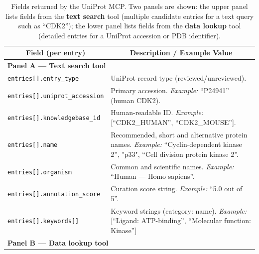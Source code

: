 \documentclass{article}
\begin{document}
\begin{table}[!htbp]
\caption{Fields returned by the UniProt MCP. Two panels are shown: the upper panel lists fields from the \textbf{text search} tool (multiple candidate entries for a text query such as “CDK2”); the lower panel lists fields from the \textbf{data lookup} tool (detailed entries for a UniProt accession or PDB identifier).}
\label{tab:uniprot-mcp-cdk2}
\begin{center}
\begin{tabularx}{\textwidth}{p{5.5cm}X}
\toprule
\multicolumn{1}{c}{\bf Field (per entry)} & \multicolumn{1}{c}{\bf Description / Example Value} \\
\midrule
\multicolumn{2}{l}{\bf Panel A — Text search tool} \\
\midrule
\texttt{entries[].entry\_type} & UniProt record type (reviewed/unreviewed). \\
\addlinespace
\texttt{entries[].uniprot\_accession} & Primary accession. \emph{Example:} “P24941” (human CDK2). \\
\addlinespace
\texttt{entries[].knowledgebase\_id} & Human-readable ID. \emph{Example:} [“CDK2\_HUMAN”, “CDK2\_MOUSE”]. \\
\addlinespace
\texttt{entries[].name} & Recommended, short and alternative protein names. \emph{Example:} “Cyclin-dependent kinase 2”, "p33", “Cell division protein kinase 2”. \\
\addlinespace
\texttt{entries[].organism} & Common and scientific names. \emph{Example:} “Human — Homo sapiens”. \\
\addlinespace
\texttt{entries[].annotation\_score} & Curation score string. \emph{Example:} “5.0 out of 5”. \\
\addlinespace
\texttt{entries[].keywords[]} & Keyword strings (category: name). \emph{Example:} [“Ligand: ATP-binding”, “Molecular function: Kinase”] \\

\midrule
\multicolumn{2}{l}{\bf Panel B — Data lookup tool} \\
\midrule


\end{tabularx}
\end{center}
\end{table}
\end{document}
